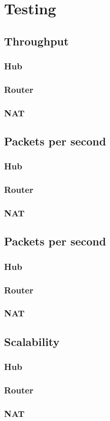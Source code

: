 \chapter{Testing}
\label{ch-testing}

\section{Throughput}
\subsection{Hub}
\subsection{Router}
\subsection{NAT}

\section{Packets per second} 
\subsection{Hub}
\subsection{Router}
\subsection{NAT}

\section{Packets per second}
\subsection{Hub}
\subsection{Router}
\subsection{NAT}

\section{Scalability}
\subsection{Hub}
\subsection{Router}
\subsection{NAT}
